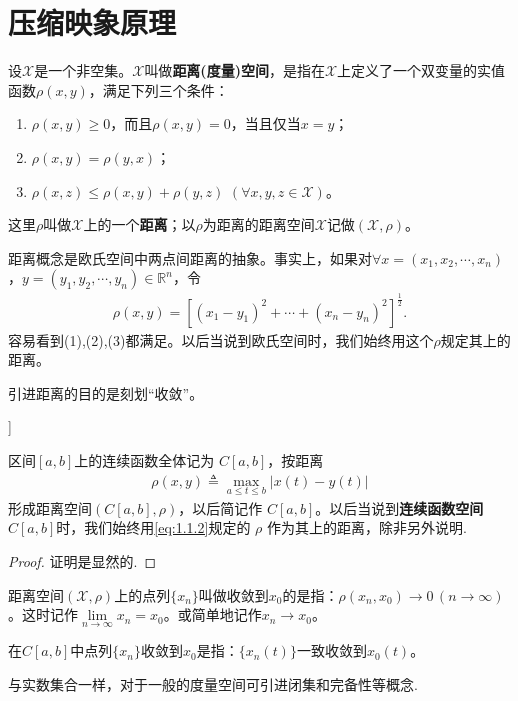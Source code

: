 \documentclass[../../main.tex]{subfiles}
\begin{document}
\section{压缩映象原理}

\begin{definition}
设$\mathscr{X}$是一个非空集。$\mathscr{X}$叫做\textbf{距离(度量)空间}，是指在$\mathscr{X}$上定义了一个双变量的实值函数$\rho(x,y)$，满足下列三个条件：
\begin{enumerate}[(1)]
\item $\rho(x,y)\geqslant 0$，而且$\rho(x,y)=0$，当且仅当$x=y$；
\item $\rho(x,y)=\rho(y,x)$；
\item $\rho(x,z)\leqslant \rho(x,y)+\rho(y,z)$ $(\forall x,y,z\in \mathscr{X})$。
\end{enumerate}
这里$\rho$叫做$\mathscr{X}$上的一个\textbf{距离}；以$\rho$为距离的距离空间$\mathscr{X}$记做$(\mathscr{X},\rho)$。
\end{definition}
\begin{remark}
距离概念是欧氏空间中两点间距离的抽象。事实上，如果对$\forall x=(x_1,x_2,\cdots,x_n)$，$y=(y_1,y_2,\cdots,y_n)\in \mathbb{R}^n$，令
\begin{align*}
\rho(x,y)=\left[(x_1 - y_1)^2 + \cdots + (x_n - y_n)^2\right]^{\frac{1}{2}}.
\end{align*}
容易看到(1),(2),(3)都满足。以后当说到欧氏空间时，我们始终用这个$\rho$规定其上的距离。
\end{remark}
\begin{note}
引进距离的目的是刻划“收敛”。
\end{note}

\begin{example}[空间C[a,b]]

区间$[a,b]$上的连续函数全体记为 $C[a,b]$，按距离
\begin{align}
\label{eq:1.1.2}
\rho(x,y) \triangleq \max_{a \leqslant t \leqslant b} |x(t) - y(t)|
\end{align}
形成距离空间$(C[a,b],\rho)$，以后简记作 $C[a,b]$。以后当说到\textbf{连续函数空间} $C[a,b]$时，我们始终用\eqref{eq:1.1.2}规定的 $\rho$ 作为其上的距离，除非另外说明.
\end{example}
\begin{proof}
证明是显然的.

\end{proof}

\begin{definition}
距离空间$(\mathscr{X},\rho)$上的点列$\{x_n\}$叫做收敛到$x_0$的是指：$\rho(x_n,x_0)\to 0\,(n\to \infty)$。这时记作$\lim\limits_{n \to \infty} x_n = x_0$。或简单地记作$x_n \to x_0$。
\end{definition}
\begin{remark}
在$C[a,b]$中点列$\{x_n\}$收敛到$x_0$是指：$\{x_n(t)\}$一致收敛到$x_0(t)$。
\end{remark}
\begin{note}
与实数集合一样，对于一般的度量空间可引进闭集和完备性等概念.
\end{note}
\end{document}
